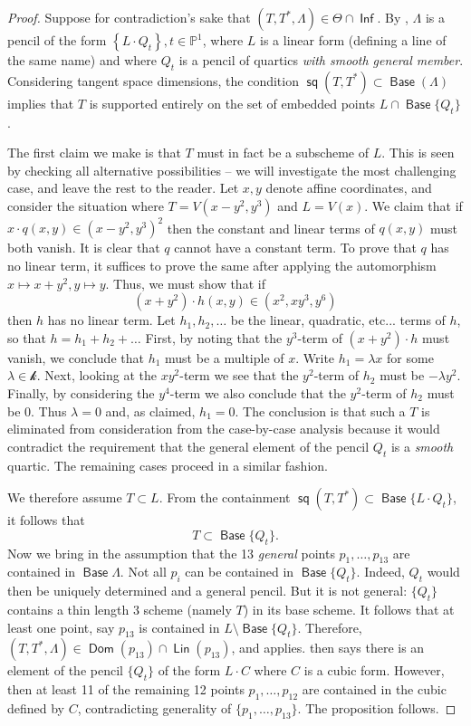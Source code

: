 \documentclass[reqno, 11pt]{amsart}
\theoremstyle{plain}
\theoremstyle{remark}
\renewcommand{\P}{\mathbb{P}}
\renewcommand{\k}{\mathscr{k}}
\DeclareMathOperator{\s}{\mathsf{sq}}
\DeclareMathOperator{\Dom}{\mathsf{Dom}}
\DeclareMathOperator{\Inf}{\mathsf{Inf}}
\DeclareMathOperator{\Lin}{\mathsf{Lin}}
\DeclareMathOperator{\Base}{\mathsf{Base}}
\begin{document}
\begin{proof}
    Suppose for contradiction's sake that $(T,T^{*},\Lambda) \in \Theta \cap \Inf$. By , $\Lambda$ is a pencil of the form $\left\{L \cdot Q_{t}\right\}, t\in \P^{1}$, where $L$ is a linear form (defining a line of the same name) and where $Q_{t}$ is a pencil of quartics \emph{with smooth general member}.  Considering tangent space dimensions, the condition $\s(T,T^{*}) \subset \Base (\Lambda)$ implies that $T$ is supported entirely on the set of embedded points $L \cap \Base \{Q_{t}\}$. 

    The first claim we make is that $T$ must in fact be a subscheme of $L$.  This is seen by checking all alternative possibilities -- we will investigate the most challenging case, and leave the rest to the reader.  Let $x,y$ denote affine coordinates, and consider the situation where  $T = V(x-y^{2},y^{3})$ and $L = V(x)$. We claim that if $x \cdot q(x,y) \in (x-y^{2},y^{3})^{2}$ then the constant and linear terms of $q(x,y)$ must both vanish.  It is clear that $q$ cannot have a constant term. To prove that $q$  has no linear term, it suffices to prove the same after applying the automorphism $x \mapsto x+y^{2},  y \mapsto y$.  Thus, we must show that if $$(x+y^{2}) \cdot h(x,y) \in (x^{2},xy^{3},y^{6})$$ then $h$ has no linear term. Let $h_{1},h_{2}, \dots$ be the linear, quadratic, etc... terms of $h$, so that $h = h_1 + h_2 + \dots$  First, by noting that the $y^{3}$-term of $(x+y^{2}) \cdot h$ must vanish, we conclude that $h_{1}$ must be a multiple of $x$. Write   $h_{1}=\lambda x$ for some $\lambda \in \k$.  Next, looking at the $xy^{2}$-term  we see that the $y^{2}$-term of $h_{2}$ must be $-\lambda y^{2}$.  Finally, by considering the $y^{4}$-term we also conclude that the $y^{2}$-term of $h_{2}$ must be $0$.  Thus $\lambda = 0$ and, as claimed, $h_{1}=0$.  The conclusion is that such a $T$ is eliminated from consideration from the case-by-case analysis because it would contradict the requirement that the general element of the pencil $Q_{t}$ is a \emph{smooth} quartic.  The remaining cases proceed in a similar fashion.

    We therefore assume $T \subset L$.  From the containment $\s(T,T^{*}) \subset \Base \{L \cdot Q_{t}\}$, it follows that $$T \subset \Base \{Q_{t}\}.$$ Now we bring in the assumption that the 13 \emph{general} points $p_{1} , \dots, p_{13}$ are contained in $\Base \Lambda$.  Not all $p_{i}$ can be contained in $\Base \{Q_{t}\}$.  Indeed, $Q_t$ would then be uniquely determined and a general pencil.  But it is not general: $\{Q_{t}\}$ contains a thin length $3$ scheme (namely $T$) in its base scheme.  It follows that at least one point, say $p_{13}$ is contained in $L \setminus \Base \{Q_{t}\}.$  Therefore, $(T,T^{*},\Lambda) \in \Dom(p_{13}) \cap \Lin(p_{13})$, and  applies.   then says there is an element of the pencil $\{Q_{t}\}$ of the form $L \cdot C$ where $C$ is a cubic form.  However, then at least 11 of the remaining 12 points $p_{1}, \dots, p_{12}$ are contained in the cubic defined by $C$, contradicting generality of $\{p_{1}, \dots, p_{13}\}$.  The proposition follows. 
\end{proof}
\end{document}
